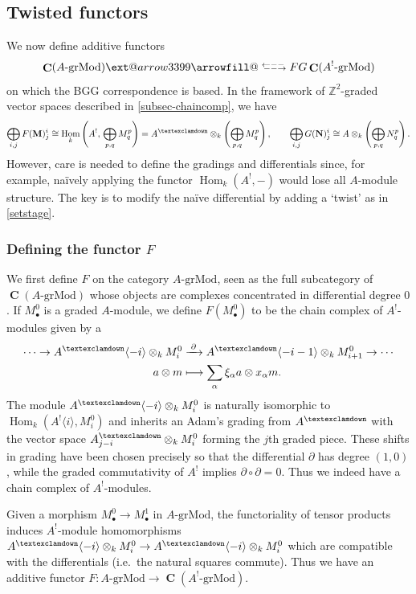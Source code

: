 \documentclass[a4paper]{article}
\makeatletter
\theoremstyle{definition}
\theoremstyle{remark}
\newcommand{\leftrarrows}{\mathrel{\raise.75ex\hbox{\oalign{%
  $\scriptstyle\leftarrow$\cr
  \vrule width0pt height.5ex$\hfil\scriptstyle\relbar$\cr}}}}
\newcommand{\lrightarrows}{\mathrel{\raise.75ex\hbox{\oalign{%
  $\scriptstyle\relbar$\hfil\cr
  $\scriptstyle\vrule width0pt height.5ex\smash\rightarrow$\cr}}}}
\newcommand{\Rrelbar}{\mathrel{\raise.75ex\hbox{\oalign{%
  $\scriptstyle\relbar$\cr
  \vrule width0pt height.5ex$\scriptstyle\relbar$}}}}
\def\leftrightarrowsfill@{\arrowfill@\leftrarrows\Rrelbar\lrightarrows}
\newcommand{\xleftrightarrows}[2][]{\ext@arrow 3399\leftrightarrowsfill@{#1}{#2}}
\newcommand{\grMod}{\ensuremath{\text{-grMod}}}
\DeclareMathOperator{\Hom}{\text{Hom}}
\DeclareMathOperator{\Ch}{\mathbf{C}}
\newcommand{\gnab}{{\textexclamdown}}
\makeatother
\begin{document}
\subsection{Twisted functors}

We now define additive functors 
\[\Ch(A\grMod) \xleftrightarrows[F]{G} \Ch(A^!\grMod)\]
on which the BGG correspondence is based. In the framework of
\(\mathbb{Z}^2\)-graded vector spaces described in \cref{subsec-chaincomp}, we have 
\[\bigoplus_{i,j}F(\mathbf{M})^i_j \cong \Hom_{k}\left(A^!,\,
\bigoplus_{p,q}M^p_q\right) = A^\gnab \otimes_k
\left(\bigoplus_{p,q}M^p_q\right), \qquad \bigoplus_{i,j}G(\mathbf{N})^i_j \cong
A\otimes_k \left(\bigoplus_{p,q}N^p_q\right).\] 
However, care is needed to define the gradings and differentials since, for
example, na\"ively applying the functor \(\Hom_k(A^!,-)\) would lose all
\(A\)-module structure. The key is to modify the na\"ive differential by adding a
`twist' as in \cref{setstage}.

\subsubsection{Defining the functor \(F\)} 
We first define \(F\) on the category \(A\grMod\), seen as the full subcategory of
\(\Ch(A\grMod)\) whose objects are complexes concentrated in differential degree
\(0\). If \(M^0_\bullet\) is a graded \(A\)-module, we define \(F(M^0_\bullet)\)
to be the chain complex of \(A^!\)-modules given by a
\begin{align*} 
    \cdots \rightarrow A^\gnab\langle -i \rangle \otimes_k M^0_i
    &\xrightarrow{\;\partial\;} A^\gnab \langle -i-1 \rangle \otimes_k
    M^0_{i+1} \rightarrow \cdots \\ 
    a\otimes m &\longmapsto \sum_\alpha \xi_\alpha a \otimes x_\alpha m.  
\end{align*} 
The module \(A^\gnab\langle -i \rangle \otimes_k M^0_i\) is naturally
isomorphic to \(\Hom_k(A^!\langle i \rangle, M^0_i)\) and inherits an Adam's
grading from \(A^\gnab\) with the vector space \(A^\gnab_{j-i}\otimes_k M^0_i\)
forming the \(j\)th graded piece. These shifts in grading have been chosen
precisely so that the differential \(\partial\) has degree \((1,0)\),  while
the graded commutativity of \(A^!\) implies \(\partial\circ \partial=0\).
Thus we indeed have a chain complex of \(A^!\)-modules. 

Given a morphism \(M^0_\bullet \rightarrow M^1_\bullet\) in \(A\grMod\),
the functoriality of tensor products induces \(A^!\)-module
homomorphisms \(A^\gnab\langle-i \rangle \otimes_k M^0_i \rightarrow
A^\gnab\langle-i\rangle \otimes_k M^0_i\) which are compatible with the
differentials (i.e.\ the natural squares commute). Thus we have an additive functor
\({F:A\grMod\rightarrow \Ch(A^!\grMod)}\).
\end{document}
